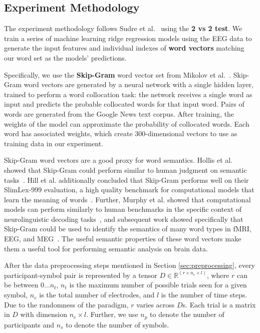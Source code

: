 
  \subsection{Experiment Methodology}
  \label{sec:methodology}
  The experiment methodology follows Sudre et al.~\cite{Sudre2012} using the {\bf 2 vs 2 test}. We train a series of machine learning ridge regression models using the EEG data to generate the input features and individual indexes of {\bf word vectors} matching our word set as the models' predictions.
  
  Specifically, we use the {\bf Skip-Gram} word vector set from Mikolov et al.~\cite{Mikolov2013}. Skip-Gram word vectors are generated by a neural network with a single hidden layer, trained to perform a word collocation task: the network receives a single word as input and predicts the probable collocated words for that input word. Pairs of words are generated from the Google News text corpus. After training, the weights of the model can approximate the probability of collocated words. Each word has associated weights, which create 300-dimensional vectors to use as training data in our experiment.
  
   Skip-Gram word vectors are a good proxy for word semantics. Hollis et al. showed that Skip-Gram could perform similar to human judgment on semantic tasks~\cite{hollis2017extrapolating}. Hill et al. additionally concluded that Skip-Gram performs well on their SlimLex-999 evaluation, a high quality benchmark for computational models that learn the meaning of words~\cite{hill2016simlex}. Further, Murphy et al. showed that computational models can perform similarly to human benchmarks in the specific context of neurolinguistic decoding tasks~\cite{Murphy2012}, and subsequent work showed specifically that Skip-Gram could be used to identify the semantics of many word types in fMRI, EEG, and MEG~\cite{xu2016brainbench}. The useful semantic properties of these word vectors make them a useful tool for performing semantic analysis on brain data.
     
  After the data preprocessing steps mentioned in Section \ref{sec:preprocessing}, every participant-symbol pair is represented by a tensor $D \in \mathbb{R}^{(r \times n_e \times l)}$, where $r$ can be between $0 \ldots n_t$, $n_t$ is the maximum number of possible trials seen for a given symbol, $n_e$ is the total number of electrodes, and $l$ is the number of time steps. Due to the randomness of the paradigm, $r$ varies across $D$s. Each trial is a matrix in $D$ with dimension $n_e \times l$. Further, we use $n_p$ to denote the number of participants and $n_s$ to denote the number of symbols. 
  
